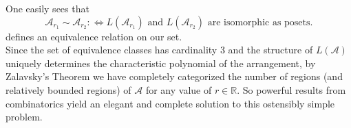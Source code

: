 \documentclass[12pt]{article}
\newcommand{\R}{\mathbb{R}}
\begin{document}
One easily sees that \[
	\mathcal{A}_{r_1} \sim \mathcal{A}_{r_2} :\iff L(\mathcal{A}_{r_1}) \text{ and } L(\mathcal{A}_{r_2}) \text{ are isomorphic as posets} 
.\]  
defines an equivalence relation on our set. \\
Since the set of equivalence classes has cardinality 3 and the structure of $L(\mathcal{A})$ uniquely determines the characteristic polynomial of the arrangement, by Zalavsky's Theorem we have completely categorized the number of regions (and relatively bounded regions) of $\mathcal{A}$ for any value of $r\in \R$. So powerful results from combinatorics yield an elegant and complete solution to this ostensibly simple problem.
\end{document}
